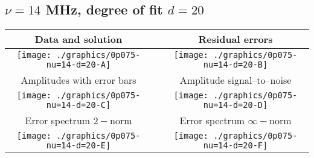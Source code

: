 

% 

\clearpage{}
\break{}

\subsection{$\nu = 14$ MHz, degree of fit $d = 20$}

\begin{table}[h]
    \begin{center}
        \begin{tabular}{ccc}
            Data and solution & \quad & Residual errors \\\hline
            \texttt{[image: ./graphics/0p075-nu=14-d=20-A]} &&
            \texttt{[image: ./graphics/0p075-nu=14-d=20-B]} \\[15pt]
            Amplitudes with error bars && Amplitude signal--to--noise \\\hline
            \texttt{[image: ./graphics/0p075-nu=14-d=20-C]} &&
            \texttt{[image: ./graphics/0p075-nu=14-d=20-D]} \\[15pt]
            Error spectrum $2-$norm && Error spectrum $\infty-$norm \\\hline
            \texttt{[image: ./graphics/0p075-nu=14-d=20-E]} &&
            \texttt{[image: ./graphics/0p075-nu=14-d=20-F]} \\[15pt]
        \end{tabular}
    \end{center}
\label{fig:elev=75, nu=14}
\end{table}



\endinput
